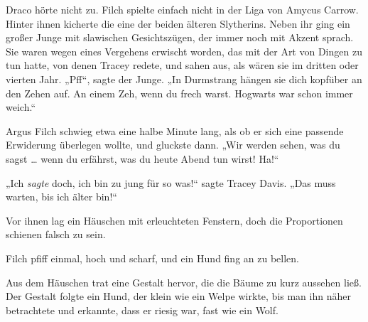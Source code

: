 Draco hörte nicht zu. Filch spielte einfach nicht in der Liga von Amycus Carrow.
Hinter ihnen kicherte die eine der beiden älteren Slytherins. Neben ihr ging ein großer Junge mit slawischen Gesichtszügen, der immer noch mit Akzent sprach. Sie waren wegen eines Vergehens erwischt worden, das mit der Art von Dingen zu tun hatte, von denen Tracey redete, und sahen aus, als wären sie im dritten oder vierten Jahr.
„Pff“, sagte der Junge.
„In Durmstrang hängen sie dich kopfüber an den Zehen auf. An einem Zeh, wenn du frech warst. Hogwarts war schon immer weich.“

Argus Filch schwieg etwa eine halbe Minute lang, als ob er sich eine passende Erwiderung überlegen wollte, und gluckste dann.
„Wir werden sehen, was du sagst … wenn du erfährst, was du heute Abend tun wirst! Ha!“

„Ich \emph{sagte} doch, ich bin zu jung für so was!“ sagte Tracey Davis.
„Das muss warten, bis ich älter bin!“

Vor ihnen lag ein Häuschen mit erleuchteten Fenstern, doch die Proportionen schienen falsch zu sein.

Filch pfiff einmal, hoch und scharf, und ein Hund fing an zu bellen.

Aus dem Häuschen trat eine Gestalt hervor, die die Bäume zu kurz aussehen ließ. Der Gestalt folgte ein Hund, der klein wie ein Welpe wirkte, bis man ihn näher betrachtete und erkannte, dass er riesig war, fast wie ein Wolf.

